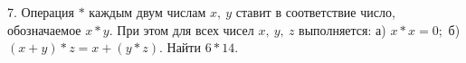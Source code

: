 7. Операция $*$ каждым двум числам $x,\ y$ ставит в соответствие число, обозначаемое $x*y.$ При этом для всех чисел $x,\ y,\ z$ выполняется: а) $x*x=0;$ б) $(x+y)*z=x+(y*z).$ Найти $6*14.$\\
